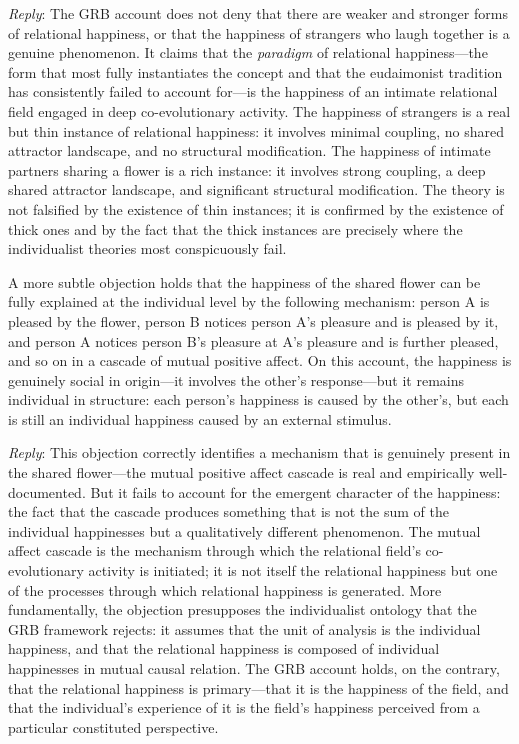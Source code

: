 \emph{Reply}: The GRB account does not deny that there are weaker and stronger forms of relational happiness, or that the happiness of strangers who laugh together is a genuine phenomenon. It claims that the \emph{paradigm} of relational happiness---the form that most fully instantiates the concept and that the eudaimonist tradition has consistently failed to account for---is the happiness of an intimate relational field engaged in deep co-evolutionary activity. The happiness of strangers is a real but thin instance of relational happiness: it involves minimal coupling, no shared attractor landscape, and no structural modification. The happiness of intimate partners sharing a flower is a rich instance: it involves strong coupling, a deep shared attractor landscape, and significant structural modification. The theory is not falsified by the existence of thin instances; it is confirmed by the existence of thick ones and by the fact that the thick instances are precisely where the individualist theories most conspicuously fail.

 A more subtle objection holds that the happiness of the shared flower can be fully explained at the individual level by the following mechanism: person A is pleased by the flower, person B notices person A's pleasure and is pleased by it, and person A notices person B's pleasure at A's pleasure and is further pleased, and so on in a cascade of mutual positive affect. On this account, the happiness is genuinely social in origin---it involves the other's response---but it remains individual in structure: each person's happiness is caused by the other's, but each is still an individual happiness caused by an external stimulus.

\emph{Reply}: This objection correctly identifies a mechanism that is genuinely present in the shared flower---the mutual positive affect cascade is real and empirically well-documented. But it fails to account for the emergent character of the happiness: the fact that the cascade produces something that is not the sum of the individual happinesses but a qualitatively different phenomenon. The mutual affect cascade is the mechanism through which the relational field's co-evolutionary activity is initiated; it is not itself the relational happiness but one of the processes through which relational happiness is generated. More fundamentally, the objection presupposes the individualist ontology that the GRB framework rejects: it assumes that the unit of analysis is the individual happiness, and that the relational happiness is composed of individual happinesses in mutual causal relation. The GRB account holds, on the contrary, that the relational happiness is primary---that it is the happiness of the field, and that the individual's experience of it is the field's happiness perceived from a particular constituted perspective.

